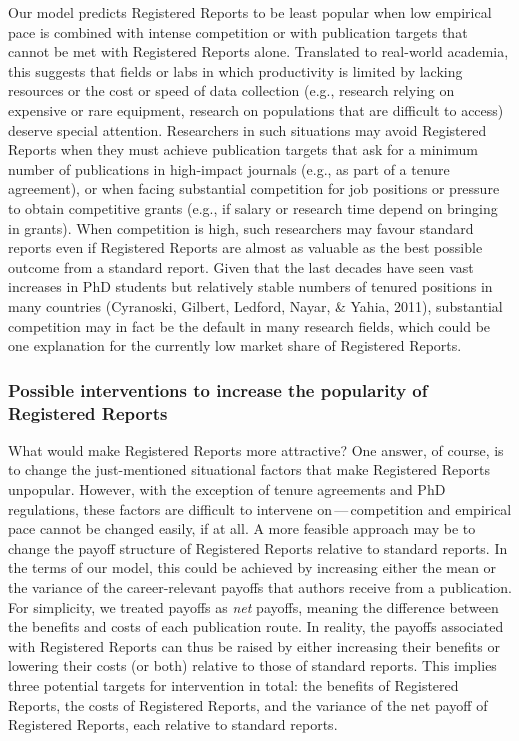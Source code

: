 \documentclass[
  british,
  a4paper,
  ,man,mask,floatsintext]{apa6}
\begin{document}
Our model predicts Registered Reports to be least popular when low empirical pace is combined with intense competition or with publication targets that cannot be met with Registered Reports alone.
Translated to real-world academia, this suggests that fields or labs in which productivity is limited by lacking resources or the cost or speed of data collection (e.g., research relying on expensive or rare equipment, research on populations that are difficult to access) deserve special attention.
Researchers in such situations may avoid Registered Reports when they must achieve publication targets that ask for a minimum number of publications in high-impact journals (e.g., as part of a tenure agreement), or when facing substantial competition for job positions or pressure to obtain competitive grants (e.g., if salary or research time depend on bringing in grants).
When competition is high, such researchers may favour standard reports even if Registered Reports are almost as valuable as the best possible outcome from a standard report.
Given that the last decades have seen vast increases in PhD students but relatively stable numbers of tenured positions in many countries (Cyranoski, Gilbert, Ledford, Nayar, \& Yahia, 2011), substantial competition may in fact be the default in many research fields, which could be one explanation for the currently low market share of Registered Reports.

\par\vspace{.8\baselineskip}

\subsubsection{Possible interventions to increase the popularity of Registered Reports}\label{possible-interventions-to-increase-the-popularity-of-registered-reports}

What would make Registered Reports more attractive?
One answer, of course, is to change the just-mentioned situational factors that make Registered Reports unpopular.
However,
with the exception of tenure agreements and PhD regulations, these
factors are difficult to intervene on\(\,\)---\(\,\)competition and empirical pace cannot be changed easily, if at all.
A more feasible approach may be to change the payoff structure of Registered Reports relative to standard reports.
In the terms of our model, this could be achieved by increasing either the mean or the variance of the career-relevant payoffs that authors receive from a publication.
For simplicity, we treated payoffs as \emph{net} payoffs, meaning the difference between the benefits and costs of each publication route.
In reality,
the payoffs associated with Registered Reports can thus be raised by either increasing their benefits or lowering their costs (or both) relative to those of standard reports.
This implies three potential targets for intervention in total:
the benefits of Registered Reports, the costs of Registered Reports, and the variance of the net payoff of Registered Reports, each relative to standard reports.
\end{document}
